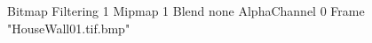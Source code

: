 {Bitmap
	{Filtering 1}
	{Mipmap 1}
	{Blend none}
	{AlphaChannel 0}
	{Frame "HouseWall01.tif.bmp"}
}
